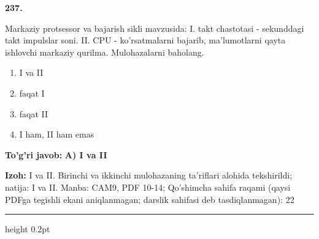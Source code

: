 \documentclass[10pt,a4paper]{article}
\begin{document}
{\bfseries\sffamily\color{ink} 237.}
\par
Markaziy protsessor va bajarish sikli mavzusida: I. takt chastotasi - sekunddagi takt impulslar soni. II. CPU - ko'rsatmalarni bajarib, ma'lumotlarni qayta ishlovchi markaziy qurilma. Mulohazalarni baholang.
\begin{enumerate}[label=\Alph*),leftmargin=9mm]
\item I va II
\item faqat I
\item faqat II
\item I ham, II ham emas
\end{enumerate}
\begin{tcolorbox}[enhanced,breakable,colback=teal!4,colframe=teal!60!black,boxrule=0.45pt,arc=1.2mm,left=2.7mm,right=2.7mm,top=1.8mm,bottom=1.8mm,before skip=2mm,after skip=2mm]
{\bfseries\sffamily\color{teal}To'g'ri javob:} \textbf{A) I va II}
\par\smallskip
{\bfseries Izoh:} I va II. Birinchi va ikkinchi mulohazaning ta'riflari alohida tekshirildi; natija: I va II. Manba: CAM9, PDF 10-14; Qo'shimcha sahifa raqami (qaysi PDFga tegishli ekani aniqlanmagan; darslik sahifasi deb tasdiqlanmagan): 22
\end{tcolorbox}
\vspace{2mm}\hrule height 0.2pt\vspace{3mm}
\end{document}
